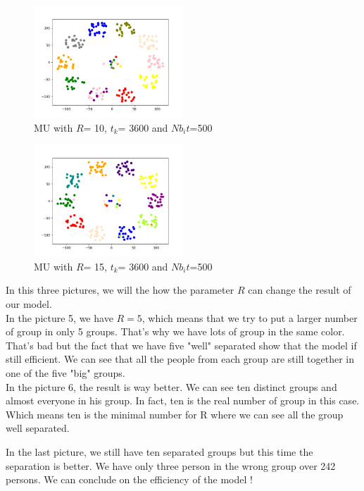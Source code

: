 \documentclass{article}
\begin{document}
\begin{figure}[h]
    \centering
    \includegraphics[width=0.5\textwidth]{images/MU500_R10_t3600.png}
    \caption{MU with $R$= 10, $t_{k}$= 3600 and $Nb_it$=500}
\end{figure}

\begin{figure}[h]
    \centering
    \includegraphics[width=0.5\textwidth]{images/MU500_R15_t3600.png}
    \caption{MU with $R$= 15, $t_{k}$= 3600 and $Nb_it$=500}
\end{figure}

In this three pictures, we will the how the parameter $R$ can change the result of our model.\\

In the picture 5, we have $R=5$, which means that we try to put a larger number of group in only 5 groups. That's why we have lots of group in the same color. That's bad but the fact that we have five "well" separated show that the model if still efficient. We can see that all the people from each group are still together in one of the five "big" groups.\\

In the picture 6, the result is way better. We can see ten distinct groups and almost everyone in his group. In fact, ten is the real number of group in this case. Which means ten is the minimal number for R where we can see all the group well separated.

In the last picture, we still have ten separated groups but this time the separation is better. We have only three person in the wrong group over 242 persons. We can conclude on the efficiency of the model !\\
\end{document}
